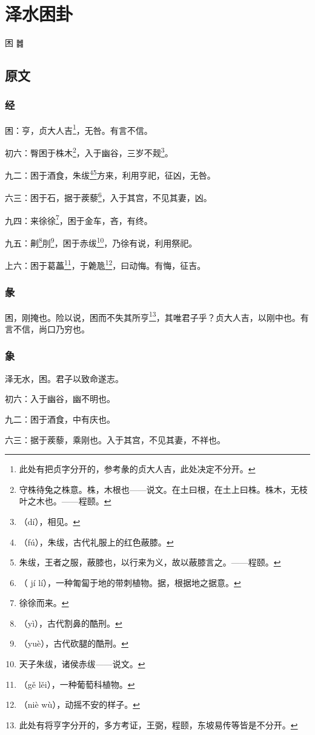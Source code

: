 \documentclass[12pt,oneside]{book}
\begin{document}
\chapter{泽水困卦}
困 {\Large ䷮}

\section{原文}

\subsection{经}
困：亨，贞大人吉\footnote{此处有把贞字分开的，参考彖的贞大人吉，此处决定不分开。}，无咎。有言不信。

初六：臀困于株木\footnote{守株待兔之株意。株，木根也——说文。在土曰根，在土上曰株。株木，无枝叶之木也。——程颐。}，入于幽谷，三岁不觌\footnote{（dí），相见。}。

九二：困于酒食，朱绂\footnote{（fú），朱绂，古代礼服上的红色蔽膝。}\footnote{朱绂，王者之服，蔽膝也，以行来为义，故以蔽膝言之。——程颐。}方来，利用亨祀，征凶，无咎。

六三：困于石，据于蒺藜\footnote{（ jí lí），一种匍匐于地的带刺植物。据，根据地之据意。}，入于其宫，不见其妻，凶。

九四：来徐徐\footnote{徐徐而来。}，困于金车，吝，有终。

九五：劓\footnote{（yì），古代割鼻的酷刑。}刖\footnote{（yuè），古代砍腿的酷刑。}，困于赤绂\footnote{天子朱绂，诸侯赤绂——说文。}，乃徐有说，利用祭祀。

上六：困于葛藟\footnote{（gě lěi），一种葡萄科植物。}，于臲卼\footnote{（niè wù），动摇不安的样子。}，曰动悔。有悔，征吉。

\subsection{彖}
困，刚掩也。险以说，困而不失其所亨\footnote{此处有将亨字分开的，多方考证，王弼，程颐，东坡易传等皆是不分开。}，其唯君子乎？贞大人吉，以刚中也。有言不信，尚口乃穷也。

\subsection{象}
泽无水，困。君子以致命遂志。

初六：入于幽谷，幽不明也。

九二：困于酒食，中有庆也。

六三：据于蒺藜，乘刚也。入于其宫，不见其妻，不祥也。
\end{document}

